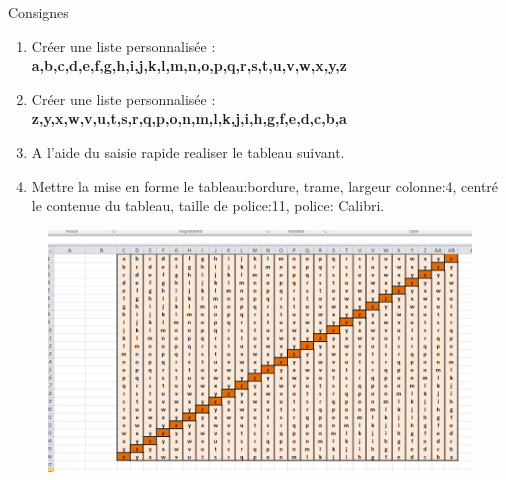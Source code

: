 \begin{exercice}\label{ex7}
	Consignes 
	\begin{enumerate}	
		\item Créer une liste personnalisée : \textbf{a,b,c,d,e,f,g,h,i,j,k,l,m,n,o,p,q,r,s,t,u,v,w,x,y,z}
		\item Créer une liste personnalisée : \textbf{z,y,x,w,v,u,t,s,r,q,p,o,n,m,l,k,j,i,h,g,f,e,d,c,b,a}		
		\item  A l'aide du saisie rapide realiser le tableau suivant.  				
		\item  Mettre la mise en forme le tableau:bordure, trame, largeur colonne:4, centré le contenue du tableau, taille de police:11, police: Calibri.
	\end{enumerate}	
\end{exercice}
\begin{figure}[H]
	\centering
	\includegraphics[scale=0.2,width=0.7 \linewidth]{img/ex07}
\end{figure}
